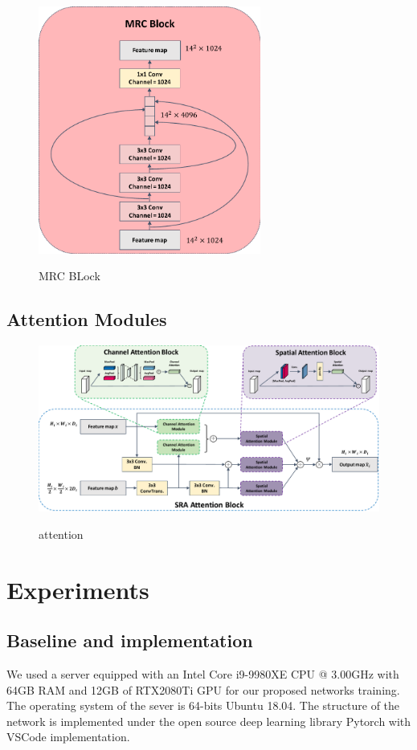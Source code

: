 \documentclass[UTF8]{article} %
\begin{document}
\begin{figure}[H]
\small
\centering
\includegraphics[width=0.65\textwidth]{mrc_block}
\label{fig:mrc_block}
\caption{MRC BLock}
\end{figure}

\subsection{Attention Modules}
\begin{figure}[H]
\small
\centering
\includegraphics[width=1\textwidth]{attention}
\label{fig:attention}
\caption{attention}
\end{figure}

\section{Experiments}
\subsection{Baseline and implementation}
We used a server equipped with an Intel Core i9-9980XE CPU @ 3.00GHz with 64GB RAM and 12GB of RTX2080Ti GPU for
our proposed networks training. The operating system of the sever is 64-bits Ubuntu 18.04. The structure of the network 
is implemented under the open source deep learning library Pytorch with VSCode implementation.
\end{document}
